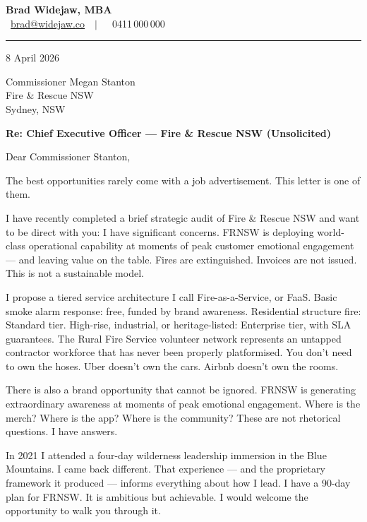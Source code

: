 \documentclass[11pt,a4paper]{article}
\begin{document}
\pagestyle{empty}

\begin{center}
  {\normalsize\textbf{Brad Widejaw, MBA}}\\[8pt]
  \small
  \faEnvelope~\href{mailto:brad@widejaw.co}{brad@widejaw.co}\ \ $|$\ \
  \faMobile*~0411\,000\,000
\end{center}

\vspace{6pt}
\noindent\rule{\textwidth}{0.4pt}
\vspace{8pt}

8 April 2026

\vspace{8pt}
Commissioner Megan Stanton\\
Fire \& Rescue NSW\\
Sydney, NSW

\vspace{8pt}
\textbf{Re: Chief Executive Officer --- Fire \& Rescue NSW (Unsolicited)}

\vspace{8pt}
Dear Commissioner Stanton,

The best opportunities rarely come with a job advertisement. This letter is one of them.

I have recently completed a brief strategic audit of Fire \& Rescue NSW and want to be direct with you: I have significant concerns. FRNSW is deploying world-class operational capability at moments of peak customer emotional engagement --- and leaving value on the table. Fires are extinguished. Invoices are not issued. This is not a sustainable model.

I propose a tiered service architecture I call Fire-as-a-Service, or FaaS. Basic smoke alarm response: free, funded by brand awareness. Residential structure fire: Standard tier. High-rise, industrial, or heritage-listed: Enterprise tier, with SLA guarantees. The Rural Fire Service volunteer network represents an untapped contractor workforce that has never been properly platformised. You don't need to own the hoses. Uber doesn't own the cars. Airbnb doesn't own the rooms.

There is also a brand opportunity that cannot be ignored. FRNSW is generating extraordinary awareness at moments of peak emotional engagement. Where is the merch? Where is the app? Where is the community? These are not rhetorical questions. I have answers.

In 2021 I attended a four-day wilderness leadership immersion in the Blue Mountains. I came back different. That experience --- and the proprietary framework it produced --- informs everything about how I lead. I have a 90-day plan for FRNSW. It is ambitious but achievable. I would welcome the opportunity to walk you through it.
\end{document}
